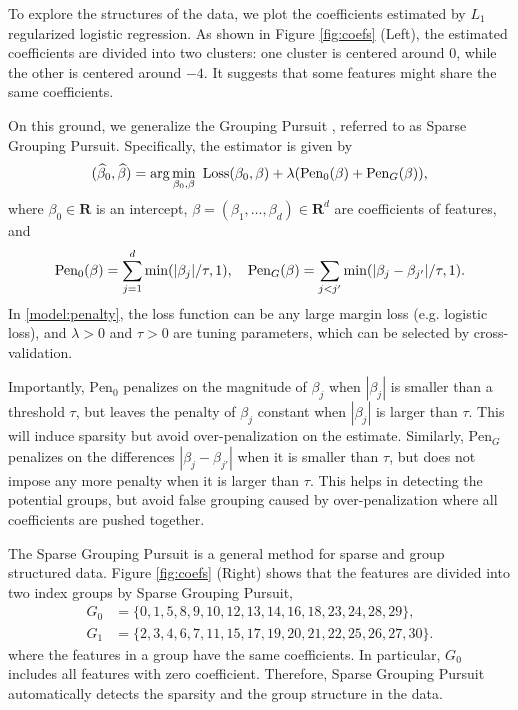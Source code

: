 \documentclass[11pt]{article}
\begin{document}
To explore the structures of the data, we plot the coefficients estimated by $L_1$ regularized logistic regression. As shown in Figure \ref{fig:coefs} (Left), the estimated coefficients are divided into two clusters: one cluster is centered around $0$, while the other is centered around $-4$. 
It suggests that some features might share the same coefficients. 

On this ground, we generalize the Grouping Pursuit \cite{shen2010grouping},
referred to as Sparse Grouping Pursuit.
Specifically, the estimator is given by
\begin{equation}\label{model:sparse-group-pursuit}
    (\widehat\beta_0, \widehat\beta) = \arg\min_{\beta_0,\beta} \ \textnormal{Loss}(\beta_0,\beta)
    + \lambda(\textnormal{Pen}_0(\beta) + \textnormal{Pen}_G(\beta)),
\end{equation}
where $\beta_0\in\mathbf{R}$ is an intercept, $\beta = (\beta_1,\ldots,\beta_d)\in\mathbf{R}^d$ are coefficients of features, and
\begin{equation}\label{model:penalty}
    \textnormal{Pen}_0(\beta) = \sum_{j=1}^d \min(|\beta_j|/\tau,1),
    \quad
    \textnormal{Pen}_G(\beta) = \sum_{j<j'} \min(|\beta_j - \beta_{j'}|/\tau,1).
\end{equation}
In \eqref{model:penalty}, the loss function can be any large margin loss (e.g. logistic loss), and $\lambda>0$ and $\tau>0$ are tuning parameters, which can be selected by cross-validation. 

Importantly, $\text{Pen}_0$ penalizes on the magnitude of $\beta_j$ when $|\beta_j|$ is smaller than a threshold $\tau$, 
but leaves the penalty of $\beta_j$ constant when $|\beta_j|$ is larger than $\tau$. This will induce sparsity but avoid over-penalization on the estimate. 
Similarly, $\text{Pen}_G$ penalizes on the differences $|\beta_j-\beta_{j'}|$ when it is smaller than $\tau$, 
but does not impose any more penalty when it is larger than $\tau$.
This helps in detecting the potential groups, 
but avoid false grouping caused by over-penalization where all coefficients are pushed together. 


The Sparse Grouping Pursuit is a general method for sparse and group structured data. Figure \ref{fig:coefs} (Right) shows that the features are divided into two index groups by Sparse Grouping Pursuit, 
\begin{equation*}
    \begin{split}
        G_0 &= \{ 0,1,5,8,9,10,12,13,14,16,18,23,24,28,29 \},\\
        G_1 &= \{ 2,3,4,6,7,11,15,17,19,20,21,22,25,26,27,30 \}.
    \end{split}
\end{equation*}
where the features in a group have the same coefficients. 
In particular, $G_0$ includes all features with zero coefficient.
Therefore, Sparse Grouping Pursuit automatically detects the sparsity and the group structure in the data.
\end{document}
